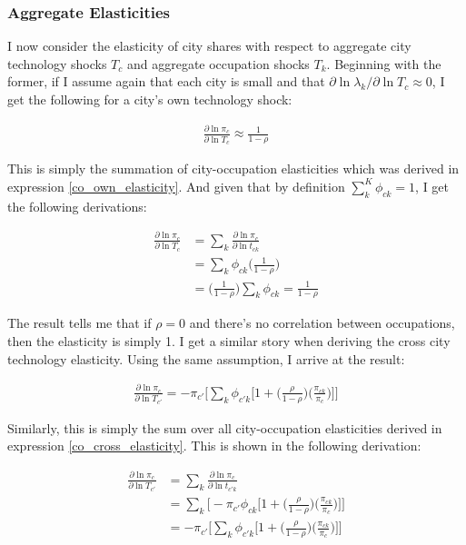 \documentclass[10pt]{article}
\begin{document}
\subsubsection{Aggregate Elasticities}

I now consider the elasticity of city shares with respect to aggregate city technology shocks $T_c$ and aggregate occupation shocks $T_k$. Beginning with the former, if I assume again that each city is small and that $\partial \ln \lambda_k / \partial \ln T_c \approx 0$, I get the following for a city's own technology shock:

\begin{align*}
    \frac{\partial \ln \pi_c}{\partial \ln T_c} \approx \frac{1}{1 - \rho}
\end{align*}

This is simply the summation of city-occupation elasticities which was derived in expression \ref{co_own_elasticity}. And given that by definition $\sum \limits_k^K \phi_{ck} = 1$, I get the following derivations:

\begin{align*}
    \frac{\partial{\ln{\pi_{c}}}}{\partial\ln{T_{c}}} & = \sum\limits_{k}\frac{\partial{\ln{\pi_{c}}}}{\partial\ln{t_{ck}}} \\ &= \sum\limits_{k}\phi_{ck}\Bigg(\frac{1}{1-\rho}\Bigg) \\ &= \Bigg(\frac{1}{1-\rho}\Bigg)\sum\limits_{k}\phi_{ck} = \frac{1}{1-\rho}
\end{align*}

The result tells me that if $\rho = 0$ and there's no correlation between occupations, then the elasticity is simply 1. I get a similar story when deriving the cross city technology elasticity. Using the same assumption, I arrive at the result:

\begin{align}
    \frac{\partial\ln{\pi_{c}}}{\partial\ln{T_{c'}}} = -\pi_{c'}\Bigg[\sum\limits_{k}\phi_{{c'}k}\Big[1+\Big(\frac{\rho}{1-\rho}\Big)\Big(\frac{\pi_{ck}}{\pi_{c}}\Big)\Big]\Bigg]
    \label{city_cross_elasticity}
\end{align}

Similarly, this is simply the sum over all city-occupation elasticities derived in expression \ref{co_cross_elasticity}. This is shown in the following derivation:

\begin{align*}
    \frac{\partial\ln{\pi_{c}}}{\partial\ln{T_{c'}}} & = \sum\limits_{k}\frac{\partial\ln{\pi_{c}}}{\partial\ln{t_{{c'}k}}} \\ &= \sum\limits_{k}\Bigg[-{\pi_{c'}}{\phi_{ck}}\Big[1+\Big(\frac{\rho}{1-\rho}\Big)\Big(\frac{\pi_{ck}}{\pi_{c}}\Big)\Big]\Bigg]\\ &= -\pi_{c'}\Bigg[\sum\limits_{k}\phi_{{c'}k}\Big[1+\Big(\frac{\rho}{1-\rho}\Big)\Big(\frac{\pi_{ck}}{\pi_{c}}\Big)\Big]\Bigg]
\end{align*}
\end{document}
